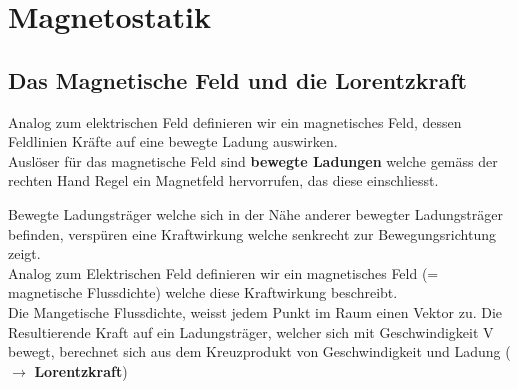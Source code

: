 
\newpage
\section{Magnetostatik}
\subsection{Das Magnetische Feld und die Lorentzkraft}

	Analog zum elektrischen Feld definieren wir ein magnetisches Feld, dessen Feldlinien Kräfte auf eine bewegte Ladung auswirken. \\
	Auslöser für das magnetische Feld sind \textbf{bewegte Ladungen} welche gemäss der rechten Hand Regel ein Magnetfeld hervorrufen, das diese einschliesst. \\
\begin{center}


	\end{center}
	\beginip
	Bewegte Ladungsträger welche sich in der Nähe anderer bewegter Ladungsträger befinden, verspüren eine Kraftwirkung welche senkrecht zur Bewegungsrichtung zeigt. \\
	Analog zum Elektrischen Feld definieren wir ein magnetisches Feld (= magnetische Flussdichte) welche diese Kraftwirkung beschreibt. \\
	Die Mangetische Flussdichte, weisst jedem Punkt im Raum einen Vektor zu. Die Resultierende Kraft auf ein Ladungsträger, welcher sich mit Geschwindigkeit V bewegt,
	berechnet sich aus dem Kreuzprodukt von Geschwindigkeit und Ladung ($\rightarrow$ \textbf{Lorentzkraft})
	\iend




